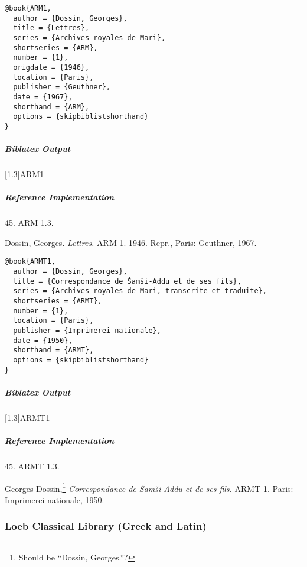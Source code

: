 \documentclass[a4paper]{article}
\newenvironment{biboutput}{%
  \subparagraph{Biblatex Output}
}{\color{black}}
\newenvironment{refimp}{%
  \subparagraph{Reference Implementation}
  \color{reference-colour}
  \rm
}{\par\color{black}}
\begin{document}
\medskip

\begin{lstlisting}
@book{ARM1,
  author = {Dossin, Georges},
  title = {Lettres},
  series = {Archives royales de Mari},
  shortseries = {ARM},
  number = {1},
  origdate = {1946},
  location = {Paris},
  publisher = {Geuthner},
  date = {1967},
  shorthand = {ARM},
  options = {skipbiblistshorthand}
}
\end{lstlisting}

\begin{biboutput}
  [1.3]{ARM1}
\end{biboutput}

\begin{refimp}
  45. ARM 1.3.

  \hangindent\bibindent Dossin, Georges. \emph{Lettres.} ARM 1. 1946. Repr.,
  Paris: Geuthner, 1967.

\end{refimp}

\medskip

\begin{lstlisting}
@book{ARMT1,
  author = {Dossin, Georges},
  title = {Correspondance de Šamši-Addu et de ses fils},
  series = {Archives royales de Mari, transcrite et traduite},
  shortseries = {ARMT},
  number = {1},
  location = {Paris},
  publisher = {Imprimerei nationale},
  date = {1950},
  shorthand = {ARMT},
  options = {skipbiblistshorthand}
}
\end{lstlisting}

\begin{biboutput}
  [1.3]{ARMT1}
\end{biboutput}

\begin{refimp}
  45. ARMT 1.3.

  \hangindent\bibindent Georges Dossin,\footnote{Should be “Dossin,
  Georges.”?} \emph{Correspondance de Šamši-Addu et de ses fils.} ARMT 1.
  Paris: Imprimerei nationale, 1950.

\end{refimp}

\subsubsection{Loeb Classical Library (Greek and Latin)}
\end{document}
